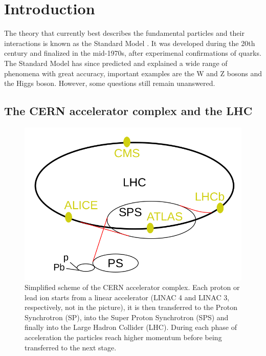 \chapter{Introduction}

The theory that currently best describes the fundamental particles and their interactions is known as the Standard Model \cite{Herrero1999}. It was developed during the 20th century and finalized in the mid-1970s, after experimenal confirmations of quarks. The Standard Model has since predicted and explained a wide range of phenomena with great accuracy, important examples are the W and Z bosons and the Higgs boson. However, some questions still remain unanswered.

\section{The CERN accelerator complex and the LHC}\label{sec:CERN_LHC}

\begin{figure}[!ht]
    \centering
    \includegraphics[width=.7\linewidth]{Images/intro/LHC.png}
    \captionsetup{width=.7\linewidth}
    \caption{Simplified scheme of the CERN accelerator complex. Each proton or lead ion starts from a linear accelerator (LINAC 4 and LINAC 3, respectively, not in the picture), it is then transferred to the Proton Synchrotron (SP), into the Super Proton Synchrotron (SPS) and finally into the Large Hadron Collider (LHC). During each phase of acceleration the particles reach higher momentum before being transferred to the next stage.}
    \label{fig:LHC}
\end{figure}



